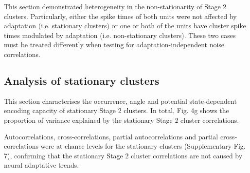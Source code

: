 \documentclass{article}
\begin{document}
This section demonstrated heterogeneity in the non-stationarity of Stage 2 clusters. Particularly, either the spike times of both units were not affected by adaptation (i.e. stationary clusters) or one or both of the units have cluster spike times modulated by adaptation (i.e. non-stationary clusters). These two cases must be treated differently when testing for adaptation-independent noise correlations.


\subsection*{Analysis of stationary clusters}
This section characterises the occurrence, angle and potential state-dependent encoding capacity of stationary Stage 2 clusters.
In total, 
Fig. 4g shows the proportion of variance explained by the stationary Stage 2 cluster correlations.


Autocorrelations, cross-correlations, partial autocorrelations and partial cross-correlations were at chance levels for the stationary clusters (Supplementary Fig. 7), confirming that the stationary Stage 2 cluster correlations are not caused by neural adaptative trends.
\end{document}
